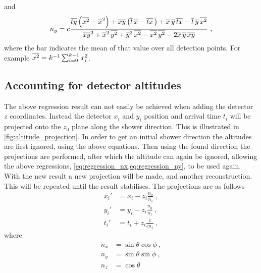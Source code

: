 %
and
%
\begin{equation}\label{eq:regression_ny}
    n_y = c \frac{\overline{t y} \left( \overline{x^2} - \overline{x}^2 \right) +
                  \overline{x y} \left( \overline{t} \, \overline{x} - \overline{t x} \, \right) +
                  \overline{x} \, \overline{y} \, \overline{t x} -
                  \overline{t} \, \overline{y} \, \overline{x^2}}
                 {\overline{x y}^2 + \overline{x}^2 \, \overline{y^2} +
                  \overline{y}^2 \, \overline{x^2} - \overline{x^2} \, \overline{y^2} -
                  2 \overline{x} \, \overline{y} \, \overline{x y}} \ ,
\end{equation}
%
where the bar indicates the mean of that value over all detection points. For example $\overline{x^2} = k^{-1} \sum_{i = 0}^{k - 1} x_i^2$.


\subsection{Accounting for detector altitudes}

The above regression result can not easily be achieved when adding the detector $z$ coordinates. Instead the detector $x_i$ and $y_i$ position and arrival time $t_i$ will be projected onto the $z_0$ plane along the shower direction. This is illustrated in \cref{fig:altitude_projection}. In order to get an initial shower direction the altitudes are first ignored, using the above equations. Then using the found direction the projections are performed, after which the altitude can again be ignored, allowing the above regressions, \cref{eq:regression_nx,eq:regression_ny}, to be used again. With the new result a new projection will be made, and another reconstruction. This will be repeated until the result stabilises. The projections are as follows
%
\begin{equation}
    \begin{align}
        x_i' &= x_i - z_i \frac{n_x}{n_z} \ , \\
        y_i' &= y_i - z_i \frac{n_y}{n_z} \ , \\
        t_i' &= t_i + z_i \frac{1}{c n_z} \ ,
    \end{align}
\end{equation}
%
where
%
\begin{equation}
    \begin{align}
        n_x &= \sin \theta \cos \phi \ , \\
        n_y &= \sin \theta \sin \phi \ , \\
        n_z &= \cos \theta
    \end{align}
\end{equation}
%

